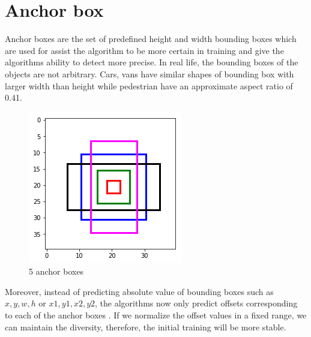\section{Anchor box}
\hspace{0.5cm}Anchor boxes are the set of predefined height and width bounding boxes which are used for assist the algorithm to be more certain in training and give the algorithms ability to detect more precise.
In real life, the bounding boxes of the objects are not arbitrary. Cars, vans have similar shapes of bounding box with larger width than height while pedestrian have an approximate aspect ratio of 0.41.
\begin{figure}[h!]
    \centering
    \includegraphics[scale=0.5]{Chapters/Fig/anchor_boxes.png}
    \caption{5 anchor boxes}
    \label{fig:ab}
\end{figure}\par
Moreover, instead of predicting absolute value of bounding boxes such as $x,y,w,h$ or $x1,y1,x2,y2$, the algorithms now only predict offsets corresponding to each of the anchor boxes . If we normalize the offset values in a fixed range, we can maintain the diversity, therefore, the initial training will be more stable.